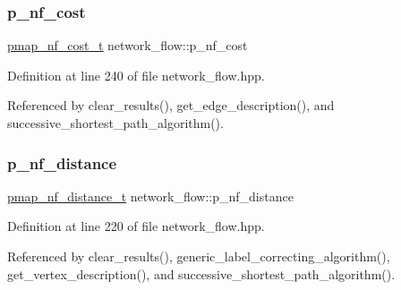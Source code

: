 \mbox{\label{classnetwork__flow_a13aa2e8135f2954b73821a0180295e32}} 
\subsubsection{\texorpdfstring{p\+\_\+nf\+\_\+cost}{p\_nf\_cost}}
{\footnotesize\ttfamily \hyperlink{classnetwork__flow_ab3d76d6bf04d076c74f5f51cc55f621e}{pmap\+\_\+nf\+\_\+cost\+\_\+t} network\+\_\+flow\+::p\+\_\+nf\+\_\+cost}



Definition at line 240 of file network\+\_\+flow.\+hpp.



Referenced by clear\+\_\+results(), get\+\_\+edge\+\_\+description(), and successive\+\_\+shortest\+\_\+path\+\_\+algorithm().

\mbox{\label{classnetwork__flow_afdcfa3c541708c8f34c6ff0629f37645}} 
\subsubsection{\texorpdfstring{p\+\_\+nf\+\_\+distance}{p\_nf\_distance}}
{\footnotesize\ttfamily \hyperlink{classnetwork__flow_a2341f0fc871494e5fa44bc4fe5967a0e}{pmap\+\_\+nf\+\_\+distance\+\_\+t} network\+\_\+flow\+::p\+\_\+nf\+\_\+distance}



Definition at line 220 of file network\+\_\+flow.\+hpp.



Referenced by clear\+\_\+results(), generic\+\_\+label\+\_\+correcting\+\_\+algorithm(), get\+\_\+vertex\+\_\+description(), and successive\+\_\+shortest\+\_\+path\+\_\+algorithm().

\mbox{\label{classnetwork__flow_af701439f65d4ff2eacf47ef05ca94885}} 
